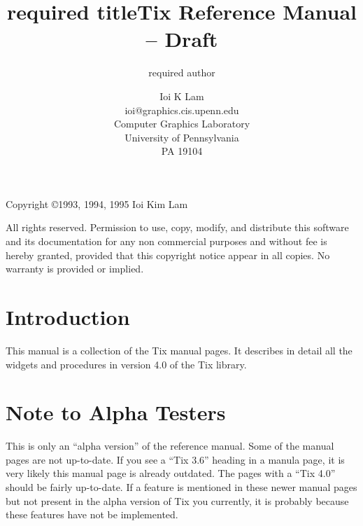 \title{required title}
\author{required author}

\title{Tix Reference Manual -- Draft}
\author{Ioi K Lam \\ ioi@graphics.cis.upenn.edu
	\\Computer Graphics Laboratory
	\\University of Pennsylvania 
	\\PA 19104}


\maketitle
\vspace{8cm}

Copyright \copyright 1993, 1994, 1995 Ioi Kim Lam

All rights reserved.  Permission to use, copy, modify, and distribute
this software and its documentation for any non commercial purposes and
without fee is hereby granted, provided that this copyright
notice appear in all copies. No warranty is provided or implied.

\pagebreak


\section{Introduction}

This manual is a collection of the Tix manual pages. It describes in
detail all the widgets and procedures in version 4.0 of the Tix library.

\section{Note to Alpha Testers}

This is only an ``alpha version'' of the reference manual. Some of the
manual pages are not up-to-date. If you see a ``Tix 3.6'' heading in a
manula page, it is very likely this manual page is already outdated.
The pages with a ``Tix 4.0'' should be fairly up-to-date. If a feature
is mentioned in these newer manual pages but not present in the alpha
version of Tix you currently, it is probably because these features
have not be implemented.



